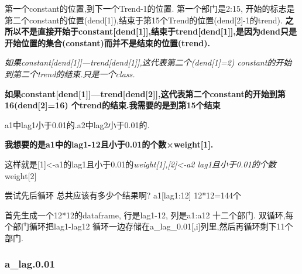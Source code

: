 \documentclass[
]{article}
\begin{document}
第一个constant的位置,到下一个Trend-1的位置. 第一个部门是2:15,
开始的标志是第二个constant的位置(dend{[}1{]}),结束于第15个Trend的位置(dend{[}2{]}-1的trend).
\textbf{之所以不是直接开始于constant{[}dend{[}1{]}{]},结束于trend{[}dend{[}1{]}{]},是因为dend只是开始位置的集合(constant)而并不是结束的位置(trend).}

\emph{如果constant{[}dend{[}1{]}{]}---trend{[}dend{[}1{]}{]},这代表第二个(dend{[}1{]}=2)
constant的开始到第二个trend的结束.只是一个class.}

\textbf{如果constant{[}dend{[}1{]}{]}---trend{[}dend{[}2{]}{]},这代表第二个constant的开始到第16(dend{[}2{]}=16)
个trend的结束.我需要的是到第15个结束}

a1中lag1小于0.01的.a2中lag2小于0.01的.

\textbf{我想要的是a1中的lag1-12且小于0.01的个数×weight{[}1{]}.}

这样就是{[}1{]}\textless-a1的lag1且小于0.01的\emph{weight{[}1{]},{[}2{]}\textless-a2
lag1且小于0.01的个数}weight{[}2{]}

尝试先后循环 总共应该有多少个结果啊? a1{[}lag1:12{]} 12*12=144个

首先生成一个12*12的dataframe, 行是lag1-12, 列是a1:a12 十二个部门.
双循环,每个部门循环把lag1-lag12
循环一边存储在a\_lag\_0.01{[},i{]}列里,然后再循环剩下11个部门.

\hypertarget{a_lag.0.01}{%
\subsubsection{a\_lag.0.01}\label{a_lag.0.01}}
\end{document}
